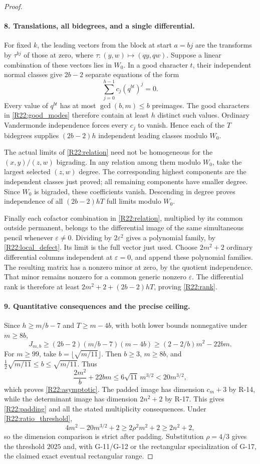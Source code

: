 \begin{proof}
\paragraph{8. Translations, all bidegrees, and a single differential.}
For fixed $k$, the leading vectors from the block at start $a=bj$
are the transforms by $\tau^{bj}$ of those at zero, where
$\tau:(y,w)\mapsto(qy,qw)$. Suppose a linear combination of these
vectors lies in $W_0$. In a good character $t$, their independent
normal classes give $2b-2$ separate equations of the form
\[
 \sum_{j=0}^{h-1}c_j(q^{bt})^j=0.
\]
Every value of $q^{bt}$ has at most $\gcd(b,m)\leq b$ preimages.
The good characters in \eqref{R22:good_modes} therefore contain
at least $h$ distinct such values. Ordinary Vandermonde independence
forces every $c_j$ to vanish. Hence each of the $T$ bidegrees supplies
$(2b-2)h$ independent leading classes modulo $W_0$.

The actual limits of \eqref{R22:relation} need not be homogeneous
for the $(x,y)/(z,w)$ bigrading. In any relation among them modulo
$W_0$, take the largest selected $(z,w)$ degree. The corresponding
highest components are the independent classes just proved; all
remaining components have smaller degree. Since $W_0$ is bigraded,
these coefficients vanish. Descending in degree proves independence
of all $(2b-2)hT$ full limits modulo $W_0$.

Finally each cofactor combination in \eqref{R22:relation}, multiplied
by its common outside permanent, belongs to the differential image
of the same simultaneous pencil whenever $\varepsilon\ne0$.
Dividing by $2\varepsilon^2$ gives a polynomial family, by
\eqref{R22:local_defect}. Its limit is the full vector just used.
Choose $2m^2+2$ ordinary differential columns independent at
$\varepsilon=0$, and append these polynomial families. The resulting
matrix has a nonzero minor at zero, by the quotient independence.
That minor remains nonzero for a common generic nonzero
$\varepsilon$. The differential rank is therefore at least
$2m^2+2+(2b-2)hT$, proving \eqref{R22:rank}.

\paragraph{9. Quantitative consequences and the precise ceiling.}
Since $h\geq m/b-7$ and $T\geq m-4b$, with both lower bounds
nonnegative under $m\geq8b$,
\[
 J_{m,b}\geq(2b-2)(m/b-7)(m-4b)
 \geq(2-2/b)m^2-22bm.
\]
For $m\geq99$, take $b=\lfloor\sqrt{m/11}\rfloor$.
Then $b\geq3$, $m\geq8b$, and
$\frac12\sqrt{m/11}\leq b\leq\sqrt{m/11}$. Thus
\[
 \frac{2m^2}{b}+22bm\leq6\sqrt{11}\,m^{3/2}
 <20m^{3/2},
\]
which proves \eqref{R22:asymptotic}. The padded image has dimension
$c_m+3$ by R-14, while the determinant image has dimension
$2n^2+2$ by R-17. This gives \eqref{R22:padding} and all the stated
multiplicity consequences. Under \eqref{R22:ratio_threshold},
\[
 4m^2-20m^{3/2}+2\geq2\rho^2m^2+2\geq2n^2+2,
\]
so the dimension comparison is strict after padding. Substitution
$\rho=4/3$ gives the threshold $2025$ and, with G-11/G-12 or the
rectangular specialization of G-17, the claimed exact eventual
rectangular range.


\end{proof}
